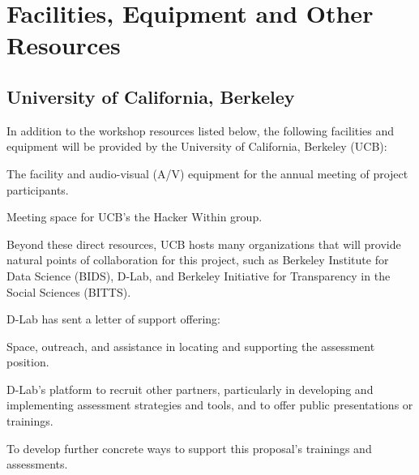 \documentclass{proposalnsf}
\newlength{\up}
\begin{document}
\newpage
{}
\renewcommand{\thepage} {\footnotesize Facilities, Equipment and Other Resources\,---\,\arabic{page}}


\section*{Facilities, Equipment and Other Resources}

\subsection*{University of California, Berkeley}

In addition to the workshop resources listed below, the following
facilities and equipment will be provided by the University of
California, Berkeley (UCB):

\begin{compactitem}

\item
  The facility and audio-visual (A/V) equipment for the annual meeting
  of project participants.

\item
  Meeting space for UCB's the Hacker Within group.

\end{compactitem}

Beyond these direct resources, UCB hosts many organizations that will
provide natural points of collaboration for this project, such as
Berkeley Institute for Data Science (BIDS), D-Lab, and Berkeley
Initiative for Transparency in the Social Sciences (BITTS).

D-Lab has sent a letter of support offering:

\begin{compactitem}

\item
  Space, outreach, and assistance in locating and supporting the
  assessment position.

\item
  D-Lab's platform to recruit other partners, particularly in
  developing and implementing assessment strategies and tools, and to
  offer public presentations or trainings.

\item
  To develop further concrete ways to support this proposal's
  trainings and assessments.

\end{compactitem}
\end{document}
